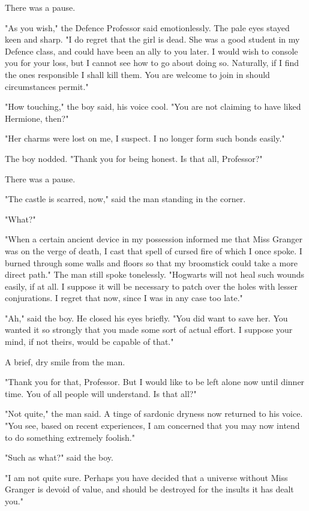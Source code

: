 There was a pause.

"As you wish," the Defence Professor said emotionlessly. The pale eyes stayed
keen and sharp. "I do regret that the girl is dead. She was a good student in
my Defence class, and could have been an ally to you later. I would wish to
console you for your loss, but I cannot see how to go about doing so.
Naturally, if I find the ones responsible I shall kill them. You are welcome to
join in should circumstances permit."

"How touching," the boy said, his voice cool. "You are not claiming to have
liked Hermione, then?"

"Her charms were lost on me, I suspect. I no longer form such bonds easily."

The boy nodded. "Thank you for being honest. Is that all, Professor?"

There was a pause.

"The castle is scarred, now," said the man standing in the corner.

"What?"

"When a certain ancient device in my possession informed me that Miss Granger
was on the verge of death, I cast that spell of cursed fire of which I once
spoke. I burned through some walls and floors so that my broomstick could take
a more direct path." The man still spoke tonelessly. "Hogwarts will not heal
such wounds easily, if at all. I suppose it will be necessary to patch over the
holes with lesser conjurations. I regret that now, since I was in any case too
late."

"Ah," said the boy. He closed his eyes briefly. "You did want to save her. You
wanted it so strongly that you made some sort of actual effort. I suppose your
mind, if not theirs, would be capable of that."

A brief, dry smile from the man.

"Thank you for that, Professor. But I would like to be left alone now until
dinner time. You of all people will understand. Is that all?"

"Not quite," the man said. A tinge of sardonic dryness now returned to his
voice. "You see, based on recent experiences, I am concerned that you may now
intend to do something extremely foolish."

"Such as what?" said the boy.

"I am not quite sure. Perhaps you have decided that a universe without Miss
Granger is devoid of value, and should be destroyed for the insults it has
dealt you."

